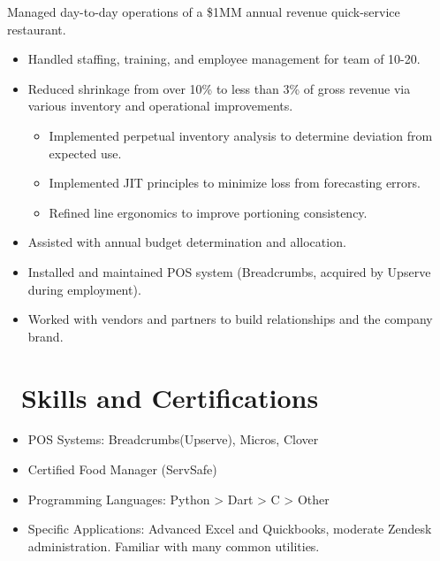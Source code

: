 \documentclass{resume}
\begin{document}
Managed day-to-day operations of a \$1MM annual revenue quick-service restaurant.
\begin{itemize}
  \item Handled staffing, training, and employee management for team of 10-20.
  \item Reduced shrinkage from over 10\% to less than 3\% of gross revenue via various inventory and operational improvements.
  \begin{itemize}
    \item Implemented perpetual inventory analysis to determine deviation from expected use.
    \item Implemented JIT principles to minimize loss from forecasting errors.
    \item Refined line ergonomics to improve portioning consistency.
  \end{itemize}
  \item Assisted with annual budget determination and allocation.
  \item Installed and maintained POS system (Breadcrumbs, acquired by Upserve during employment).
  \item Worked with vendors and partners to build relationships and the company brand.
\end{itemize}



\section{\faCogs\ Skills and Certifications}
\begin{itemize}[parsep=0.5ex]
  \item POS Systems: Breadcrumbs(Upserve), Micros, Clover
  \item Certified Food Manager (ServSafe)
  \item Programming Languages: Python > Dart > C > Other
  \item Specific Applications: Advanced Excel and Quickbooks, moderate Zendesk administration. Familiar with many common utilities.
\end{itemize}


%
%
\end{document}

